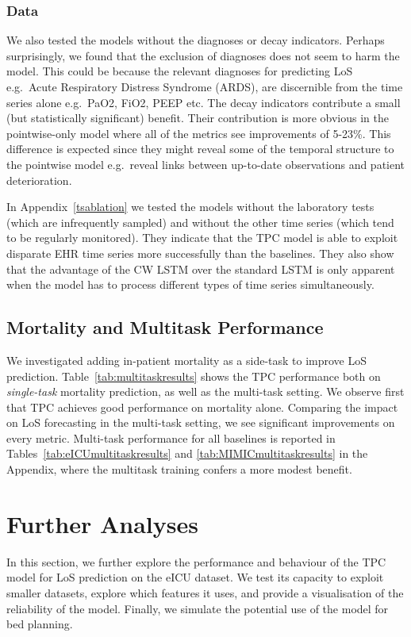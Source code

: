 \documentclass[sigconf]{acmart}
\begin{document}
\subsubsection{Data}
We also tested the models without the diagnoses or decay indicators. Perhaps surprisingly, we found that the exclusion of diagnoses does not seem to harm the model. This could be because the relevant diagnoses for predicting LoS e.g.\ Acute Respiratory Distress Syndrome (ARDS), are discernible from the time series alone e.g.\ PaO2, FiO2, PEEP etc. The decay indicators contribute a small (but statistically significant) benefit. Their contribution is more obvious in the pointwise-only model where all of the metrics see improvements of 5-23\%. This difference is expected since they might reveal some of the temporal structure to the pointwise model e.g.\ reveal links between up-to-date observations and patient deterioration. 

In Appendix~\ref{tsablation} we tested the models without the laboratory tests (which are infrequently sampled) and without the other time series (which tend to be regularly monitored). They indicate that the TPC model is able to exploit disparate EHR time series more successfully than the baselines. They also show that the advantage of the CW LSTM over the standard LSTM is only apparent when the model has to process different types of time series simultaneously.

\subsection{Mortality and Multitask Performance}
We investigated adding in-patient mortality as a side-task to improve LoS prediction. Table~\ref{tab:multitaskresults} shows the TPC performance both on \emph{single-task} mortality prediction, as well as the multi-task setting. We observe first that TPC achieves good performance on mortality alone. Comparing the impact on LoS forecasting in the multi-task setting, we see significant improvements on every metric. Multi-task performance for all baselines is reported in Tables~\ref{tab:eICUmultitaskresults} and \ref{tab:MIMICmultitaskresults} in the Appendix, where the multitask training confers a more modest benefit.

\section{Further Analyses}
In this section, we further explore the performance and behaviour of the TPC model for LoS prediction on the eICU dataset. We test its capacity to exploit smaller datasets, explore which features it uses, and provide a visualisation of the reliability of the model. Finally, we simulate the potential use of the model for bed planning.
\end{document}
